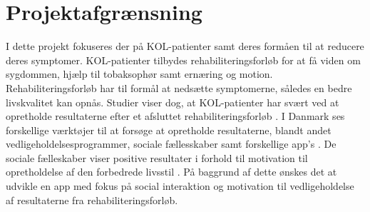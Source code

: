 \section{Projektafgrænsning}
I dette projekt fokuseres der på KOL-patienter samt deres formåen til at reducere deres symptomer. KOL-patienter tilbydes rehabiliteringsforløb for at få viden om sygdommen, hjælp til tobaksophør samt ernæring og motion. Rehabiliteringsforløb har til formål at nedsætte symptomerne, således en bedre livskvalitet kan opnås.\cite{Lungeforeningen2016,McCarthy2015,Habraken2011,Sundhedsstyrelsen2015} Studier viser dog, at KOL-patienter har svært ved at opretholde resultaterne efter et afsluttet rehabiliteringsforløb \cite{Egan2012,Beachamp2013,Zanaboni2017,Ringbaek2008}. I Danmark ses forskellige værktøjer til at forsøge at opretholde resultaterne, blandt andet vedligeholdelsesprogrammer, sociale fællesskaber samt forskellige app's \cite{Sundhedsstyrelsen2015,HealthcareDenmark2017}. De sociale fælleskaber viser positive resultater i forhold til motivation til opretholdelse af den forbedrede livsstil \cite{dsam2016}.
På baggrund af dette ønskes det at udvikle en app med fokus på social interaktion og motivation til vedligeholdelse af resultaterne fra rehabiliteringsforløb. 
